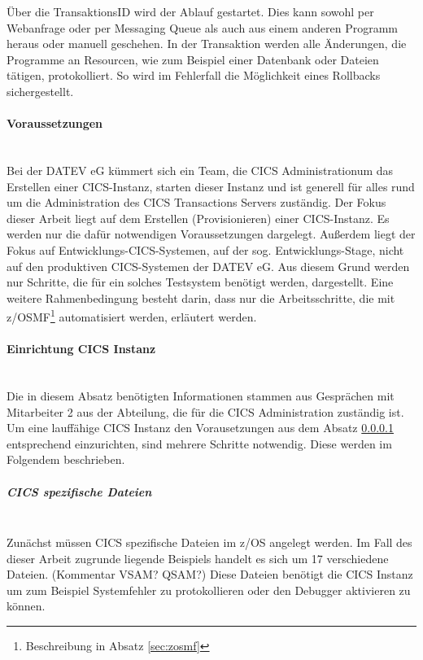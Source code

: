 Über die TransaktionsID wird der Ablauf gestartet.
Dies kann sowohl per Webanfrage oder per Messaging Queue als auch aus einem anderen Programm heraus oder manuell geschehen.
In der Transaktion werden alle Änderungen, die Programme an Resourcen, wie zum Beispiel einer Datenbank oder Dateien tätigen, protokolliert.
So wird im Fehlerfall die Möglichkeit eines Rollbacks sichergestellt.
 \cite{Rayns.2011}

\paragraph{Voraussetzungen}\label{subsec:voraus} ~\\
Bei der DATEV eG kümmert sich ein Team, die \glqq CICS Administration\grqq{}um das Erstellen einer CICS-Instanz, starten dieser Instanz und ist generell für alles rund um die Administration des CICS Transactions Servers zuständig.
Der Fokus dieser Arbeit liegt auf dem Erstellen (\glqq Provisionieren\grqq{}) einer CICS-Instanz. Es werden nur die dafür notwendigen Voraussetzungen dargelegt.
Außerdem liegt der Fokus auf Entwicklungs-CICS-Systemen, auf der sog. Entwicklungs-Stage, nicht auf den produktiven CICS-Systemen der DATEV eG. 
Aus diesem Grund werden nur Schritte, die für ein solches Testsystem benötigt werden, dargestellt.
Eine weitere Rahmenbedingung besteht darin, dass nur die Arbeitsschritte, die mit z/OSMF\footnote{Beschreibung in Absatz \ref{sec:zosmf}} automatisiert werden, erläutert werden.

\paragraph{Einrichtung CICS Instanz}\label{subsec:createCICS}~\\
Die in diesem Absatz benötigten Informationen stammen aus Gesprächen mit Mitarbeiter 2 aus der Abteilung, die für die CICS Administration zuständig ist.
Um eine lauffähige CICS Instanz den Vorausetzungen aus dem Absatz \ref{subsec:voraus} entsprechend einzurichten, sind mehrere Schritte notwendig.
Diese werden im Folgendem beschrieben.

\subparagraph{CICS spezifische Dateien}\label{sssec:speziDat} ~\\
Zunächst müssen CICS spezifische Dateien im z/OS angelegt werden.
Im Fall des dieser Arbeit zugrunde liegende Beispiels handelt es sich um 17 verschiedene Dateien. (Kommentar VSAM? QSAM?)
Diese Dateien benötigt die CICS Instanz um zum Beispiel Systemfehler zu protokollieren oder den Debugger aktivieren zu können.


